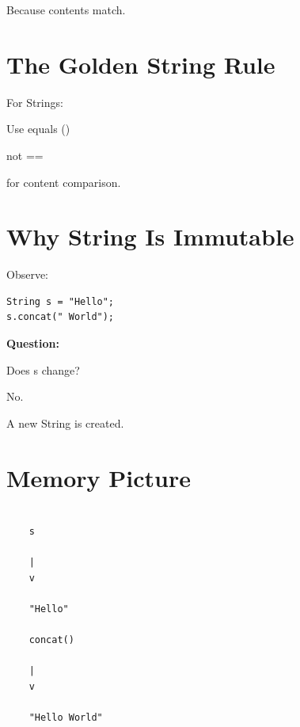 \documentclass[11pt,a4paper]{book}
\begin{document}

Because contents match.


\section{The Golden String Rule}

\begin{rosettarule}

For Strings:

Use equals ()

not ==

for content comparison.

\end{rosettarule}


\section{Why String Is Immutable}

Observe:

\begin{verbatim}
String s = "Hello";
s.concat(" World");
\end{verbatim}


\textbf{Question:}

Does s change?


No.


A new String is created.


\section{Memory Picture}

\begin{verbatim}

    s

    |
    v

    "Hello"

    concat()

    |
    v

    "Hello World"

\end{verbatim}
\end{document}
